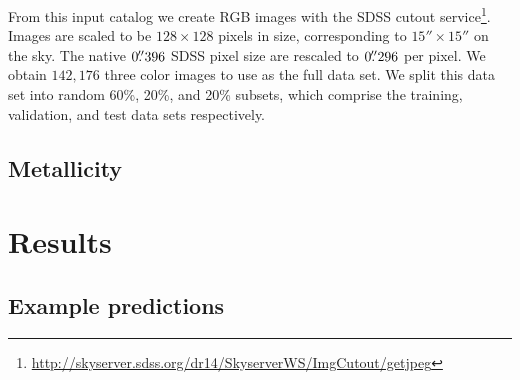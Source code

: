\documentclass[fleqn,usenatbib]{mnras}
\begin{document}
From this input catalog we create RGB images with the SDSS cutout service\footnote{\url{http://skyserver.sdss.org/dr14/SkyserverWS/ImgCutout/getjpeg}}. Images are scaled to be $128\times128$ pixels in size, corresponding to $15''\times15''$ on the sky. The native $0\hbox{$.\!\!^{\prime\prime}$}396$ SDSS pixel size are rescaled to $0\hbox{$.\!\!^{\prime\prime}$}296$ per pixel.
We obtain $142,176$ three color images to use as the full data set.
We split this data set into random 60\%, 20\%, and 20\% subsets, which comprise the training, validation, and test data sets respectively.

\subsection{Metallicity}


\section{Results}\label{sec:results}


\subsection{Example predictions}
\end{document}
